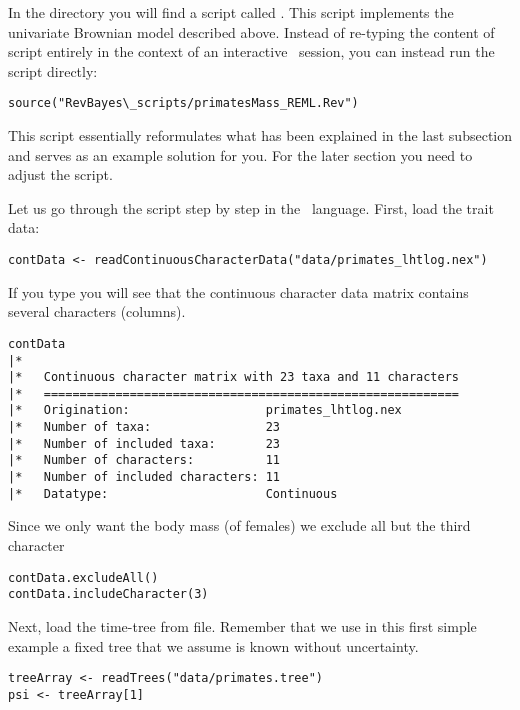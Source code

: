 In the directory  you will find a script called .
This script implements the univariate Brownian model described above. Instead of re-typing the content of script entirely in the context of an interactive \RevBayes~session, you can instead run the script directly:
{\tt \small \begin{snugshade*}
\begin{lstlisting}
source("RevBayes\_scripts/primatesMass_REML.Rev")
\end{lstlisting}
\end{snugshade*}}
This script essentially reformulates what has been explained in the last subsection and serves as an example solution for you. For the later section you need to adjust the script.

Let us go through the script step by step in the \Rev~language.
First, load the trait data:
{\tt \small \begin{snugshade*}
\begin{lstlisting}
contData <- readContinuousCharacterData("data/primates_lhtlog.nex")
\end{lstlisting}
\end{snugshade*}}
If you type you will see that the continuous character data matrix contains several characters (columns). 
{\tt \small \begin{snugshade*}
\begin{lstlisting}
contData
|*
|*   Continuous character matrix with 23 taxa and 11 characters
|*   ==========================================================
|*   Origination:                   primates_lhtlog.nex
|*   Number of taxa:                23
|*   Number of included taxa:       23
|*   Number of characters:          11
|*   Number of included characters: 11
|*   Datatype:                      Continuous
\end{lstlisting}
\end{snugshade*}}
Since we only want the body mass (of females) we exclude all but the third character
{\tt \small \begin{snugshade*}
\begin{lstlisting}
contData.excludeAll()
contData.includeCharacter(3) 
\end{lstlisting}
\end{snugshade*}}

Next, load the time-tree from file. Remember that we use in this first simple example a fixed tree that we assume is known without uncertainty.
{\tt \small \begin{snugshade*}
\begin{lstlisting}
treeArray <- readTrees("data/primates.tree")
psi <- treeArray[1]
\end{lstlisting}
\end{snugshade*}}

